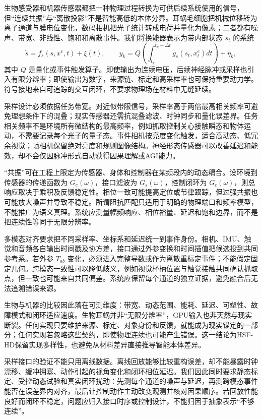 生物感受器和机器传感器都把一种物理过程转换为可供后续系统使用的信号，但“连续共振”与“离散投影”不是智能高低的本体分界。耳蜗毛细胞把机械位移转为离子通道与膜电位变化，数码相机把光子统计转成电荷并量化为像素；二者都有噪声、带宽、非线性、饱和和离散事件。我们将换能器表示为带内部状态 $s_t$ 的系统
\[
\dot s=f_s(s,x^e,t)+\xi(t),\qquad y_k=Q\!\left(\int_{t_k}^{t_k+\Delta t}g_s(s_t,x_t^e)dt\right)+\eta_k,
\]
其中 $Q$ 是量化或事件触发算子。即使输出为连续电压，后续神经脉冲或采样也引入有限分辨率；即使输出为数字，来源链、标定和高采样率也可保持重要动力学。符号接地来自可追踪的交互闭环，不要求物理场在材料中无缝延续。

采样设计必须依据任务带宽。对近似带限信号，采样率高于两倍最高相关频率可避免理想条件下的混叠；现实传感器还需抗混叠滤波、时钟同步和量化误差界。任务相关频率不是环境所有微结构的最高频率，例如抓取控制关心接触瞬态和物体运动，不需要记录每个光子的量子态。事件相机按亮度变化触发，适合高动态、低冗余视觉；帧相机保留绝对亮度和规则图像结构。神经形态传感器可以改善延迟和能效，却不会仅因脉冲形式自动获得因果理解或AGI能力。

“共振”可在工程上限定为传感器、身体和控制器在某频段内的动态耦合。设环境到传感器的传递函数为 $G_e(\omega)$，接口滤波为 $G_s(\omega)$，控制闭环为 $G_c(\omega)$，则总响应取决于乘积及反馈稳定性。相位一致可能提高定位或节律跟踪，但过强共振也可能放大噪声并导致不稳定。所谓阻抗匹配只适用于明确的物理端口和频率模型，不能推广为语义真理。系统应测量幅频响应、相位裕量、延迟和饱和边界，而不是把连续性等同于无限分辨率。

多模态对齐要求把不同采样率、坐标系和延迟统一到事件身份。相机、IMU、触觉和音频各自输出时间戳及协方差，接口通过外参变换和时间插值把候选投到共同参考系。若外参 $T_{ab}$ 变化，必须进入完整导数或作为离散重标定事件；不能假定固定几何。跨模态一致性可以降低歧义，例如视觉杯柄位置与触觉接触共同确认抓取点，但一致也可能来自共同偏差。系统应保留每个通道的独立证据，避免融合后无法追溯错误来源。

生物与机器的比较因此落在可测维度：带宽、动态范围、能耗、延迟、可塑性、故障模式和闭环适应速度。生物耳蜗并非“无限分辨率”，GPU输入也非天然与现实断裂。任何实现只要维护来源、标定、对象身份和反馈，就能成为现实锚定的一部分；任何实现若忽略这些契约，即使物理连续也可能产生错误。这一结论为HSF-HD保留实现多样性，也避免从材料差异直接推导智能本体差异。

采样接口的验证不能只用离线数据。离线回放能够比较重构误差，却不能暴露时钟漂移、缓冲拥塞、动作引起的视角变化和闭环相位延迟。我们因此同时要求静态标定、受控动态试验和真实闭环扰动：先测每个通道的噪声与延迟，再测跨模态事件能否在误差界内对齐，最后让控制动作主动改变观测并核对因果顺序。若回放性能良好而闭环不稳定，问题应归入接口时序或控制设计，不能归因于抽象表示“不够连续”。


